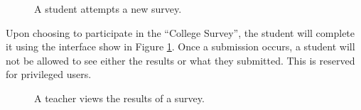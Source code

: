 \begin{figure}[h!]
	\centering
	\caption{A student attempts a new survey.}
	\label{fig:screens-survey-show}
\end{figure}

Upon choosing to participate in the ``College Survey'', the student will complete it using the interface show in Figure \ref{fig:screens-survey-show}. Once a submission occurs, a student will not be allowed to see either the results or what they submitted. This is reserved for privileged users.

\begin{figure}[h!]
	\centering
	\caption{A teacher views the results of a survey.}
	\label{fig:screens-survey-results}
\end{figure}

